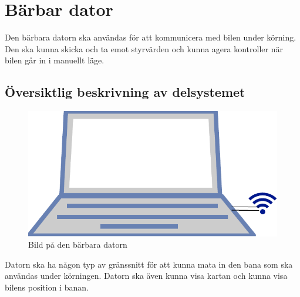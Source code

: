 \documentclass[systemskiss/skiss.tex]{subfiles}
\begin{document}
\section{Bärbar dator}
Den bärbara datorn ska användas för att kommunicera med bilen under körning. Den ska kunna skicka och ta emot styrvärden och kunna agera kontroller när bilen går in i manuellt läge.
\subsection{Översiktlig beskrivning av delsystemet}
\begin{figure}[h]
    \centering
    \includegraphics[width=0.6\linewidth]{systemskiss/figures/laptop.pdf}
    \caption{Bild på den bärbara datorn}
    \label{fig:laptopskiss}
\end{figure}
Datorn ska ha någon typ av gränssnitt för att kunna mata in den bana som ska användas under körningen. Datorn ska även kunna visa kartan och kunna visa bilens position i banan.  
\end{document}
